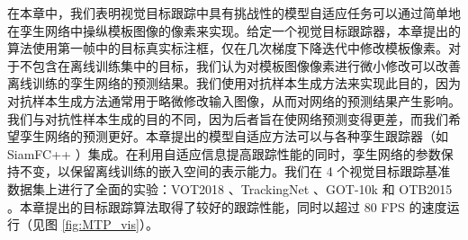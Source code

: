 在本章中，我们表明视觉目标跟踪中具有挑战性的模型自适应任务可以通过简单地在孪生网络中操纵模板图像的像素来实现。给定一个视觉目标跟踪器，本章提出的算法使用第一帧中的目标真实标注框，仅在几次梯度下降迭代中修改模板像素。对于不包含在离线训练集中的目标，我们认为对模板图像像素进行微小修改可以改善离线训练的孪生网络的预测结果。我们使用对抗样本生成方法来实现此目的，因为对抗样本生成方法通常用于略微修改输入图像，从而对网络的预测结果产生影响。我们与对抗性样本生成的目的不同，因为后者旨在使网络预测变得更差，而我们希望孪生网络的预测更好。本章提出的模型自适应方法可以与各种孪生跟踪器（如 SiamFC++ \cite{SiamFC++}）集成。在利用自适应信息提高跟踪性能的同时，孪生网络的参数保持不变，以保留离线训练的嵌入空间的表示能力。我们在 4 个视觉目标跟踪基准数据集上进行了全面的实验：VOT2018 \cite{kristan2018sixth}、TrackingNet \cite{muller2018trackingnet}、GOT-10k \cite{GOT-10k} 和 OTB2015 \cite{OTB2015}。本章提出的目标跟踪算法取得了较好的跟踪性能，同时以超过 80 FPS 的速度运行（见图 \ref{fig:MTP_vis}）。
